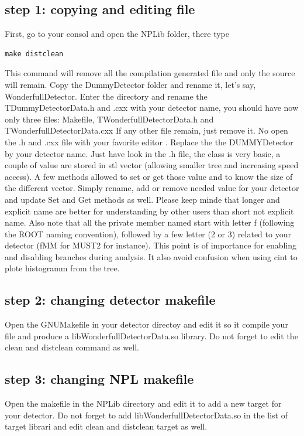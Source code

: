 \documentclass{book}
\begin{document}
		\subsection{step 1: copying and editing file}
			First, go to your consol and open the NPLib folder, there type \begin{verbatim}make distclean\end{verbatim}
			This command will remove all the compilation generated file and only the source will remain.
			Copy the DummyDetector folder and rename it, let's say, WonderfullDetector. 
			Enter the directory and rename the TDummyDetectorData.h and .cxx with your detector name, you should have now only three files: Makefile, TWonderfullDetectorData.h and TWonderfullDetectorData.cxx
			If any other file remain, just remove it.
			No open the .h and .cxx file with your favorite editor . Replace the the DUMMYDetector by your detector name. Just have look in the .h file, the class is very basic, a couple of value are stored in stl vector (allowing smaller tree and increasing speed access). A few methods allowed to set or get those value and to know the size of the different vector. Simply rename, add or remove needed value for your detector and update Set and Get methods as well. Please keep minde that longer and explicit name are better for understanding by other users than short not explicit name. Also note that all the private member named start with letter f (following the ROOT naming convention), followed by a few letter (2 or 3) related to your detector (fMM for MUST2 for instance). This point is of importance for enabling and disabling branches during analysis. It also avoid confusion when using cint to plote histogramm from the tree.
			
		\subsection{step 2: changing detector makefile}
			Open the GNUMakefile in your detector directoy and edit it so it compile your file and produce a libWonderfullDetectorData.so library. Do not forget to edit the clean and distclean command as well.
			
		\subsection{step 3: changing NPL makefile}
			Open the makefile in the NPLib directory and edit it to add a new target for your detector. Do not forget to add libWonderfullDetectorData.so in the list of target librari and edit clean and distclean target as well.
		
\end{document}
